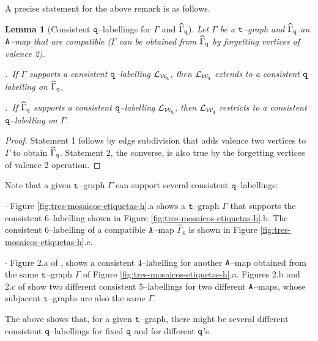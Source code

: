 \documentclass[final,3p,times]{elsarticle}
\newtheorem{lemma}[theorem]{Lemma}
\theoremstyle{definition}
\begin{document}
A precise statement for the above remark is as follows.

\begin{lemma}[Consistent $\tt q$--labellings for $\Gamma$ and $\widehat{\Gamma}_{\tt q}$]
\label{lem:consistent-labelings-Gamma-hatGamma}
Let $\Gamma$ be a $\tt t$--graph and $\widehat{\Gamma}_{\tt q}$ an $\tt A$--map that
are compatible 
($\Gamma$ can be obtained from $\widehat{\Gamma}_{\tt q}$ by forgetting vertices of valence 2).

.\ If $\Gamma$ supports a consistent $\tt q$--labelling $\mathcal{L}_{\mathcal{W}_{\tt q}}$, 
then $\mathcal{L}_{\mathcal{W}_{\tt q}}$ extends to a consistent $\tt q$--labelling on
$\widehat{\Gamma}_{\tt q}$.

.\ If $\widehat{\Gamma}_{\tt q}$ supports a consistent $\tt q$--labelling 
$\mathcal{L}_{\mathcal{W}_{\tt q}}$, 
then $\mathcal{L}_{\mathcal{W}_{\tt q}}$ restricts to a consistent $\tt q$--labelling on
$\Gamma$.
\end{lemma}
\begin{proof}
Statement 1 follows by edge subdivision that 
adds valence two vertices to $\Gamma$ to obtain $\widehat{\Gamma}_{\tt q}$.
Statement 2, the converse, is also true by the forgetting vertices of valence 2 operation.
\end{proof}

Note that a given $\tt t$--graph $\Gamma$ can support several consistent $\tt q$--labellings:

\noindent
$\cdot$ 
Figure \ref{fig:tres-mosaicos-etiquetas-h}.a
shows a $\tt t$--graph $\Gamma$ that supports the 
consistent $6$--labelling shown in 
Figure \ref{fig:tres-mosaicos-etiquetas-h}.b.
The consistent $6$--labelling of a compatible 
$\tt A$--map $\widehat{\Gamma}_{6}$ 
is shown in Figure \ref{fig:tres-mosaicos-etiquetas-h}.c.

\noindent
$\cdot$ 
Figure 2.a of \cite{AlvarezGutierrezMucino}, shows a consistent $4$--labelling for another
$\tt A$--map obtained from the same $\tt t$--graph $\Gamma$ 
of Figure \ref{fig:tres-mosaicos-etiquetas-h}.a. 
Figures 2.b and 2.c 
of \cite{AlvarezGutierrezMucino}
show two different
consistent $5$--labellings for two different $\tt A$--maps, whose subjacent $\tt t$--graphs are 
also the same $\Gamma$.

\noindent
The above shows that, for a given $\tt t$--graph, there might be several different consistent 
$\tt q$--labellings for fixed $\tt q$ and for different $\tt q$'s.
\end{document}
